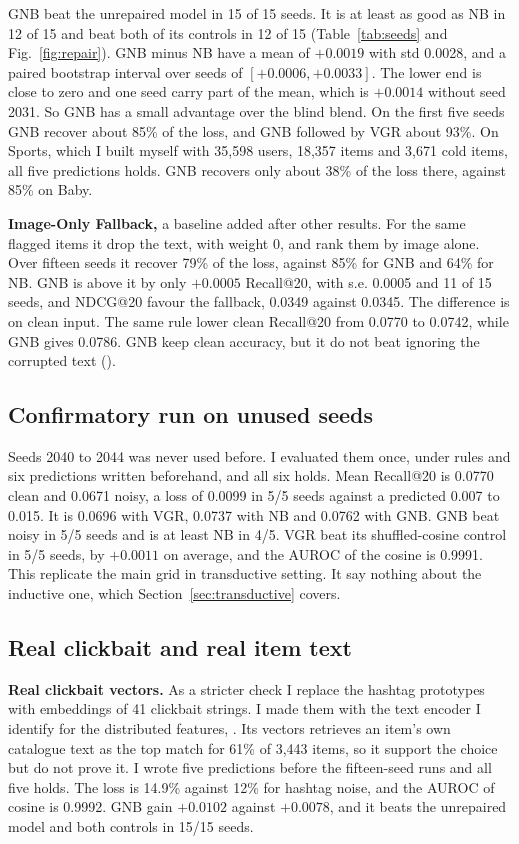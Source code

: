\documentclass[conference]{IEEEtran}
\newcommand{\code}[1]{\texttt{\detokenize{#1}}}
\begin{document}
GNB beat the unrepaired model in 15 of 15 seeds. It is at least as good as NB in 12 of 15 and beat both of its controls in 12 of 15 (Table~\ref{tab:seeds} and Fig.~\ref{fig:repair}). GNB minus NB have a mean of $+0.0019$ with std 0.0028, and a paired bootstrap interval over seeds of $[+0.0006,+0.0033]$. The lower end is close to zero and one seed carry part of the mean, which is $+0.0014$ without seed 2031. So GNB has a small advantage over the blind blend. On the first five seeds GNB recover about 85\% of the loss, and GNB followed by VGR about 93\%. On Sports, which I built myself with 35,598 users, 18,357 items and 3,671 cold items, all five predictions holds. GNB recovers only about 38\% of the loss there, against 85\% on Baby.

\textbf{Image-Only Fallback,} a baseline added after other results. For the same flagged items it drop the text, with weight 0, and rank them by image alone. Over fifteen seeds it recover 79\% of the loss, against 85\% for GNB and 64\% for NB. GNB is above it by only $+0.0005$ Recall@20, with s.e. 0.0005 and 11 of 15 seeds, and NDCG@20 favour the fallback, 0.0349 against 0.0345. The difference is on clean input. The same rule lower clean Recall@20 from 0.0770 to 0.0742, while GNB gives 0.0786. GNB keep clean accuracy, but it do not beat ignoring the corrupted text (\code{results/rq2\_image\_only.md}).

\subsection{Confirmatory run on unused seeds}
\label{sec:confirm}
Seeds 2040 to 2044 was never used before. I evaluated them once, under rules and six predictions written beforehand, and all six holds. Mean Recall@20 is 0.0770 clean and 0.0671 noisy, a loss of 0.0099 in 5/5 seeds against a predicted 0.007 to 0.015. It is 0.0696 with VGR, 0.0737 with NB and 0.0762 with GNB. GNB beat noisy in 5/5 seeds and is at least NB in 4/5. VGR beat its shuffled-cosine control in 5/5 seeds, by $+0.0011$ on average, and the AUROC of the cosine is 0.9991. This replicate the main grid in transductive setting. It say nothing about the inductive one, which Section~\ref{sec:transductive} covers.

\subsection{Real clickbait and real item text}
\label{sec:clickbait}\label{sec:realtext}
\textbf{Real clickbait vectors.} As a stricter check I replace the hashtag prototypes with embeddings of 41 clickbait strings. I made them with the text encoder I identify for the distributed features, \code{roberta-large-nli-stsb-mean-tokens}. Its vectors retrieves an item's own catalogue text as the top match for 61\% of 3,443 items, so it support the choice but do not prove it. I wrote five predictions before the fifteen-seed runs and all five holds. The loss is 14.9\% against 12\% for hashtag noise, and the AUROC of cosine is 0.9992. GNB gain $+0.0102$ against $+0.0078$, and it beats the unrepaired model and both controls in 15/15 seeds.
\end{document}
